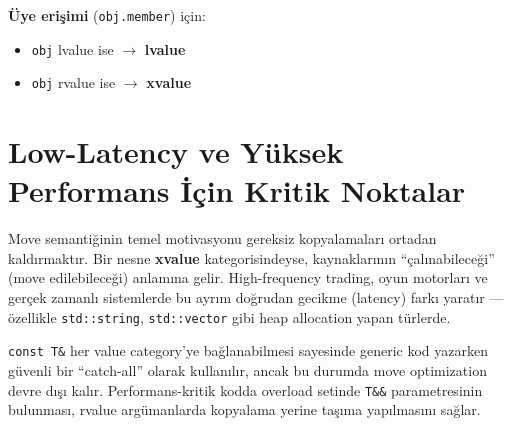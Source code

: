 \documentclass[a4paper,12pt]{article}
\begin{document}
\noindent\textbf{Üye erişimi} (\texttt{obj.member}) için:
\begin{itemize}
    \item \texttt{obj} lvalue ise $\rightarrow$ \textbf{lvalue}
    \item \texttt{obj} rvalue ise $\rightarrow$ \textbf{xvalue}
\end{itemize}

\section{Low-Latency ve Yüksek Performans İçin Kritik Noktalar}

\begin{notebox}
Move semantiğinin temel motivasyonu gereksiz kopyalamaları ortadan kaldırmaktır. Bir nesne \textbf{xvalue} kategorisindeyse, kaynaklarının ``çalınabileceği'' (move edilebileceği) anlamına gelir. High-frequency trading, oyun motorları ve gerçek zamanlı sistemlerde bu ayrım doğrudan gecikme (latency) farkı yaratır --- özellikle \texttt{std::string}, \texttt{std::vector} gibi heap allocation yapan türlerde.
\end{notebox}

\begin{notebox}
\texttt{const T\&} her value category'ye bağlanabilmesi sayesinde generic kod yazarken güvenli bir ``catch-all'' olarak kullanılır, ancak bu durumda move optimization devre dışı kalır. Performans-kritik kodda overload setinde \texttt{T\&\&} parametresinin bulunması, rvalue argümanlarda kopyalama yerine taşıma yapılmasını sağlar.
\end{notebox}
\end{document}
